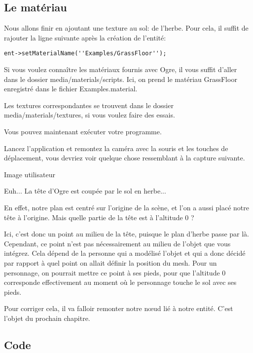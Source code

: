 \subsection{Le matériau}

Nous allons finir en ajoutant une texture au sol: de l'herbe. Pour cela, il suffit de rajouter la ligne suivante après la création de l'entité:
\begin{lstlisting}
ent->setMaterialName(''Examples/GrassFloor'');
\end{lstlisting}

Si vous voulez connaître les matériaux fournis avec Ogre, il vous suffit d'aller dans le dossier media/materials/scripts. Ici, on prend le matériau GrassFloor enregistré dans le fichier Examples.material. 

Les textures correspondantes se trouvent dans le dossier media/materials/textures, si vous voulez faire des essais.


Vous pouvez maintenant exécuter votre programme.

Lancez l'application et remontez la caméra avec la souris et les touches de déplacement, vous devriez voir quelque chose ressemblant à la capture suivante.

Image utilisateur

Euh... La tête d'Ogre est coupée par le sol en herbe...

En effet, notre plan est centré sur l'origine de la scène, et l'on a aussi placé notre tête à l'origine. Mais quelle partie de la tête est à l'altitude 0 ?

Ici, c'est donc un point au milieu de la tête, puisque le plan d'herbe passe par là.
Cependant, ce point n'est pas nécessairement au milieu de l'objet que vous intégrez. Cela dépend de la personne qui a modélisé l'objet et qui a donc décidé par rapport à quel point on allait définir la position du mesh. Pour un personnage, on pourrait mettre ce point à ses pieds, pour que l'altitude 0 corresponde effectivement au moment où le personnage touche le sol avec ses pieds.

Pour corriger cela, il va falloir remonter notre nœud lié à notre entité. C'est l'objet du prochain chapitre.





\subsection{Code}

